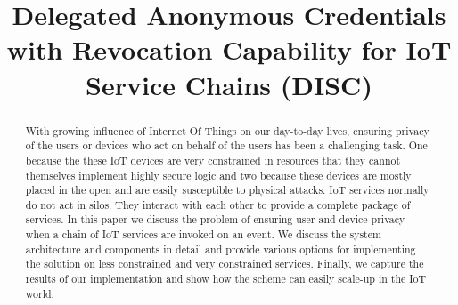 \documentclass[journal]{IEEEtran}
\begin{document}
\title{Delegated Anonymous Credentials with Revocation Capability for IoT Service Chains (DISC)}
\author{

}

\IEEEoverridecommandlockouts
{}

\maketitle

\begin{abstract}
With growing influence of Internet Of Things on our day-to-day lives, ensuring privacy of the users or devices who act on behalf of the users has been a challenging task. One because the these IoT devices are very constrained in resources that they cannot themselves implement highly secure logic and two because these devices are mostly placed in the open and are easily susceptible to physical attacks. IoT services normally do not act in silos. They interact with each other to provide a complete package of services. In this paper we discuss the problem of ensuring user and device privacy when a chain of IoT services are invoked on an event. We discuss the system architecture and components in detail and provide various options for implementing the solution on less constrained and very constrained services. Finally, we capture the results of our implementation and show how the scheme can easily scale-up in the IoT world.

\end{abstract}

\begin{IEEEkeywords}

\end{IEEEkeywords}

\IEEEpeerreviewmaketitle
\end{document}
